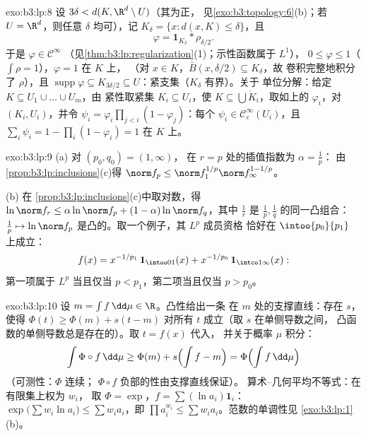 \begin{solution}{exo:b3:lp:8}
设 $3\delta < d(K, \R^d\setminus U)$（其为正，
见\cref{exo:b3:topology:6}(b)；若 $U = \R^d$，则任意 $\delta$
均可），记 $K_\delta = \{x : d(x, K) \leq \delta\}$，且
\[
\varphi = \mathbf 1_{K_\delta} * \rho_{\delta/2} .
\]
于是 $\varphi \in \mathcal C^\infty$
（见\cref{thm:b3:lp:regularization}(1)；示性函数属于 $L^1$），
$0 \leq \varphi \leq 1$（$\int\rho = 1$），$\varphi = 1$ 在 $K$ 上，
（对 $x \in K$，$\bar B(x, \delta/2) \subseteq K_\delta$，故
卷积完整地积分了 $\rho$），且
$\operatorname{supp}\varphi \subseteq K_{3\delta/2} \subseteq
U$：紧支集（$K_\delta$ 有界）。关于
单位分解：给定 $K \subseteq U_1\cup\dots\cup U_m$，由
紧性取紧集 $K_i \subseteq U_i$，使 $K \subseteq
\bigcup \mathring K_i$，取如上的 $\varphi_i$，对 $(K_i,
U_i)$，并令 $\psi_i = \varphi_i\prod_{j <i}(1 -
\varphi_j)$：每个 $\psi_i \in \mathcal C_c^\infty(U_i)$，且
$\sum_i\psi_i = 1 - \prod_i(1 - \varphi_i) = 1$ 在 $K$ 上。
\end{solution}

\begin{solution}{exo:b3:lp:9}
(a) 对 $(p_0, q_0) = (1, \infty)$，
在 $r = p$ 处的插值指数为 $\alpha = \frac1p$：
由\cref{prop:b3:lp:inclusions}(c)得 $\norm f_p \leq \norm
f_1^{1/p}\norm f_\infty^{1 - 1/p}$。

(b) 在
\cref{prop:b3:lp:inclusions}(c)中取对数，得 $\ln\norm f_r \leq
\alpha\ln\norm f_p + (1-\alpha)\ln\norm f_q$，其中 $\frac1r$
是 $\frac1p, \frac1q$ 的同一凸组合：$\frac1p
\mapsto \ln\norm f_p$ 是凸的。取一个例子，其 $L^p$ 成员资格
恰好在 $\intoo{p_0}{p_1}$ 上成立：
\[
f(x) = x^{-1/p_1}\,\mathbf 1_{\intoo01}(x) +
x^{-1/p_0}\,\mathbf 1_{\intco1\infty}(x):
\]
第一项属于 $L^p$ 当且仅当 $p < p_1$，第二项当且仅当 $p >
p_0$。
\end{solution}

\begin{solution}{exo:b3:lp:10}
设 $m = \int f\,\dd\mu \in \R$。凸性给出一条
在 $m$ 处的支撑直线：存在 $s$，使得 $\Phi(t) \geq \Phi(m) + s(t -
m)$ 对所有 $t$ 成立（取 $s$ 在单侧导数之间，
凸函数的单侧导数总是存在的）。取 $t = f(x)$ 代入，
并关于概率 $\mu$ 积分：
\[
\int\Phi\circ f\,\dd\mu \geq \Phi(m) + s\Bigl(\int f - m\Bigr)
= \Phi\Bigl(\int f\,\dd\mu\Bigr)
\]
（可测性：$\Phi$ 连续；
$\Phi\circ f$ 负部的性由支撑直线保证）。
算术–几何平均不等式：在有限集上权为 $w_i$，
取 $\Phi = \exp$，$f = \sum(\ln a_i)\mathbf 1_i$：
$\exp\bigl(\sum w_i\ln a_i\bigr) \leq \sum w_ia_i$，即
$\prod a_i^{w_i} \leq \sum w_ia_i$。范数的单调性见
\cref{exo:b3:lp:1}(b)。
\end{solution}

